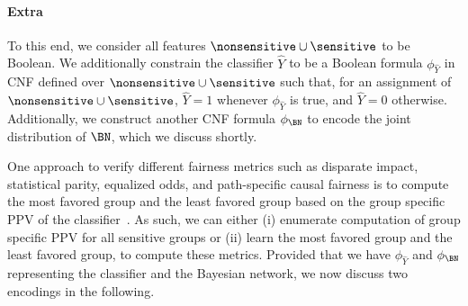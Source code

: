\paragraph{Extra}
To this end, we consider all features $ \nonsensitive \cup \sensitive $ to be Boolean. We additionally constrain the classifier $ \hat{Y} $  to be a Boolean formula $ \phi_{\hat{Y}} $ in CNF defined over $ \nonsensitive \cup \sensitive $ such that, for an assignment of $ \nonsensitive \cup \sensitive $, $ \hat{Y} = 1 $ whenever $ \phi_{\hat{Y}} $ is true, and $ \hat{Y} = 0 $ otherwise. Additionally, we construct another CNF formula $ \phi_\BN $ to encode the joint distribution of $ \BN $, which we discuss shortly.

One approach to verify different fairness metrics such as disparate impact, statistical parity, equalized odds, and path-specific causal fairness is to compute the most favored group and the least favored group based on the group specific PPV of the classifier~\cite{ghosh2020justicia}. As such, we can either (i) enumerate computation of group specific PPV for all sensitive groups or (ii) learn the most favored group and the least favored group, to compute these metrics. 	Provided that we have  $ \phi_{\hat{Y}} $ and $ \phi_\BN $ representing the classifier and the Bayesian network, we now discuss two encodings in the following. 

